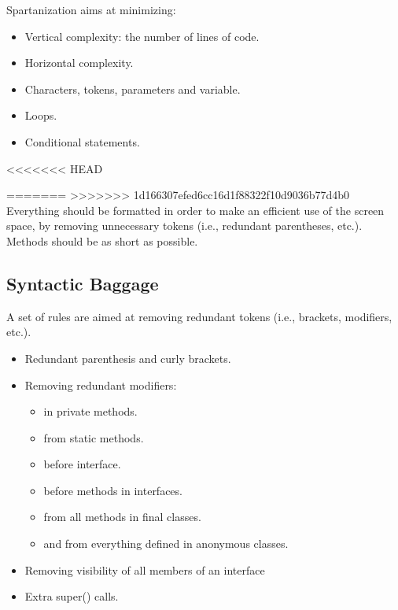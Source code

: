 Spartanization aims at minimizing:
\begin{itemize}
 \item Vertical complexity: the number of lines of code.
 \item Horizontal complexity.
 \item Characters, tokens, parameters and variable.
 \item Loops.
 \item Conditional statements.
\end{itemize}

<<<<<<< HEAD


=======
>>>>>>> 1d166307efed6cc16d1f88322f10d9036b77d4b0
Everything should be formatted in order to make an efficient use of the screen space,
by removing unnecessary tokens (i.e., redundant parentheses, etc.).
Methods should be as short as possible.

\subsection{Syntactic Baggage}
A set of rules are aimed at removing redundant tokens (i.e., brackets,
modifiers, etc.).
\begin{itemize}
  \item Redundant parenthesis and curly brackets.
  \item Removing redundant modifiers:
  \begin{itemize}
    \item {} in private methods.
    \item {} from static methods.
    \item {} before interface.
    \item {} before methods in interfaces.
    \item {} from all methods in final classes.
    \item {} and  from everything defined in anonymous classes.
  \end{itemize}
  \item Removing visibility of all members of an interface
  \item Extra super() calls.
\end{itemize}

